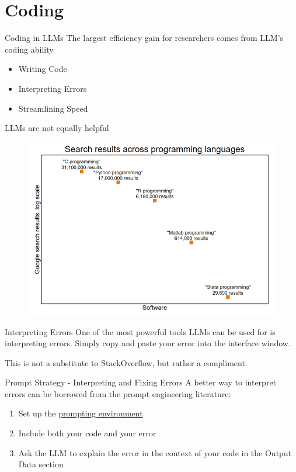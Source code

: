 \documentclass[aspectratio=43]{beamer}
\begin{document}
\section{Coding}
\begin{frame}{Coding in LLMs}
    The largest efficiency gain for researchers comes from LLM's coding ability. 
    \begin{itemize}
        \item Writing Code
        \item Interpreting Errors
        \item Streamlining Speed
    \end{itemize}
\end{frame}
\begin{frame}{LLMs are not equally helpful}
    \begin{figure}
        \centering
        \includegraphics{Availability of Results on Internet.png}
    \end{figure}
\end{frame}
\begin{frame}{Interpreting Errors}
    One of the most powerful tools LLMs can be used for is interpreting errors. Simply copy and paste your error into the interface window.

    \bigbreak 
    This is not a substitute to StackOverflow, but rather a compliment.
\end{frame}
\begin{frame}{Prompt Strategy - Interpreting and Fixing Errors}
    A better way to interpret errors can be borrowed from the \alert{prompt engineering} literature:
    \begin{enumerate}
        \item Set up the \hyperlink{Prompt Structure}{prompting environment}
        \item Include both your code and your error
        \item Ask the LLM to explain the error in the context of your code in the \alert{Output Data} section
    \end{enumerate}
\end{frame}
\end{document}
